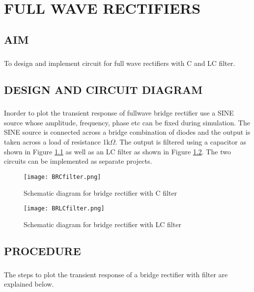 \chapter{FULL WAVE RECTIFIERS}

\section*{AIM}
\paragraph{}To design and implement circuit for full wave rectifiers with C and LC filter.
\section*{DESIGN AND CIRCUIT DIAGRAM}
\paragraph{}

Inorder to plot the transient response of fullwave bridge rectifier use a SINE source whose amplitude, frequency, phase etc can be fixed during simulation. The SINE source is connected across a  bridge combination of diodes and the output is taken across a load of resistance 1k$\Omega$. The output is filtered using a capacitor as shown in Figure \ref{BRCfilter}	as well as an LC filter as shown in Figure \ref{BRLCfilter}. The two circuits can be implemented as separate projects.

\begin{figure}[h]
\centering
\texttt{[image: BRCfilter.png]}
\caption{Schematic diagram for bridge rectifier with C filter}
\label{BRCfilter}
\end{figure}

\begin{figure}[h]
\centering
\texttt{[image: BRLCfilter.png]}
\caption{Schematic diagram for bridge rectifier with LC filter}
\label{BRLCfilter}
\end{figure}


\section*{PROCEDURE}

\paragraph{}The steps to plot the transient response of a bridge rectifier with filter are explained below. 
